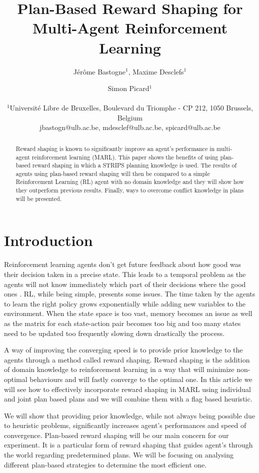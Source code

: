 \documentclass[letterpaper]{article}
\title{Plan-Based Reward Shaping for Multi-Agent Reinforcement Learning}
\author{Jérôme Bastogne$^{1}$, Maxime Desclefs$^{1}$ \and Simon Picard$^{1}$ \\
\mbox{}\\
$^1$Université Libre de Bruxelles, Boulevard du Triomphe - CP 212, 1050 Brussels, Belgium \\
jbastogn@ulb.ac.be, mdesclef@ulb.ac.be, spicard@ulb.ac.be}
\begin{document}
\maketitle

\begin{abstract}
Reward shaping is known to significantly improve an agent’s performance in multi-agent reinforcement
learning (MARL). This paper shows the benefits of using plan-based reward shaping in which a STRIPS planning knowledge is used. The results of agents using plan-based reward shaping will then be compared to a simple Reinforcement Learning (RL) agent with no domain knowledge and they will show how they outperform previous results. Finally, ways to overcome conflict knowledge in plans will be presented.
\end{abstract}

\section{Introduction}

Reinforcement learning agents don't get future feedback about how good was their decision taken in a precise state. This leads to a temporal problem as the agents will not know immediately which part of their decisions where the good ones \citep{rs}. RL, while being simple, presents some issues. The time taken by the agents to learn the right policy grows exponentially while adding new variables to the environment. When the state space is too vast, memory becomes an issue as well as the matrix for each state-action pair becomes too big and too many states need to be updated too frequently slowing down drastically the process. 

A way of improving the converging speed is to provide prior knowledge to the agents through a method called reward shaping. Reward shaping is the addition of domain knowledge to reinforcement learning in a way that will minimize non-optimal behaviours and will fastly converge to the optimal one. In this article we will see how to effectively incorporate reward shaping in MARL using individual and joint plan based plans and we will combine them with a flag based heuristic\citep{paper4}.

We will show that providing prior knowledge, while not always being possible due to heuristic problems, significantly increases agent's performances and speed of convergence. Plan-based reward shaping will be our main concern for our experiment. It is a particular form of reward shaping that guides agent's through the world regarding predetermined plans. We will be focusing on analysing different plan-based strategies to determine the most efficient one.
\end{document}
